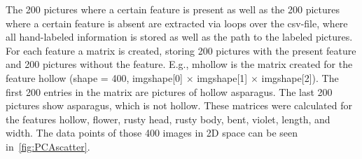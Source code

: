 The 200 pictures where a certain feature is present as well as the 200 pictures where a certain feature is absent are extracted via loops over the csv-file, where all hand-labeled information is stored as well as the path to the labeled pictures. For each feature a matrix is created, storing 200 pictures with the present feature and 200 pictures without the feature. E.g., m\textunderscore hollow is the matrix created for the feature hollow (shape = 400, img\textunderscore shape[0] $\times$ img\textunderscore shape[1] $\times$ img\textunderscore shape[2]). The first 200 entries in the matrix are pictures of hollow asparagus. The last 200 pictures show asparagus, which is not hollow. These matrices were calculated for the features hollow, flower, rusty head, rusty body, bent, violet, length, and width. The data points of those 400 images in 2D space can be seen in~\autoref{fig:PCAscatter}.

